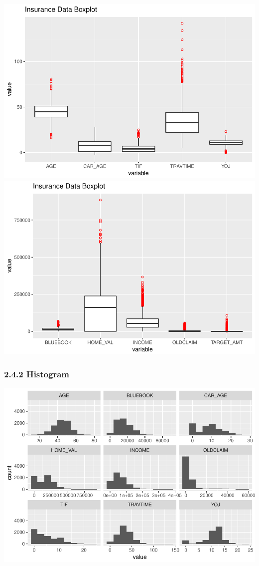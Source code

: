 \documentclass[]{article}
\begin{document}
\includegraphics{DATA_621_Homework_4_files/figure-latex/summary-boxplot-1.pdf}
\includegraphics{DATA_621_Homework_4_files/figure-latex/summary-boxplot-2.pdf}

\subsubsection{2.4.2 Histogram}\label{histogram}

\includegraphics{DATA_621_Homework_4_files/figure-latex/summary-histogram-1.pdf}
\end{document}
